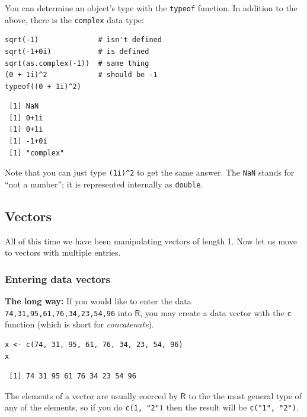 \documentclass[captions=tableheading]{scrbook}
\begin{document}
You can determine an object's type with the \texttt{typeof} function. In addition to the above, there is the \texttt{complex} data type:


\lstset{language=R}
\begin{lstlisting}
sqrt(-1)              # isn't defined
sqrt(-1+0i)           # is defined
sqrt(as.complex(-1))  # same thing
(0 + 1i)^2            # should be -1
typeof((0 + 1i)^2)
\end{lstlisting}

\begin{verbatim}
 [1] NaN
 [1] 0+1i
 [1] 0+1i
 [1] -1+0i
 [1] "complex"
\end{verbatim}

Note that you can just type \texttt{(1i)\textasciicircum{}2} to get the same answer. The \texttt{NaN} stands for ``not a number''; it is represented internally as \texttt{double}. 
\subsection{Vectors}
\label{sec-2-3-3}
\label{sub-Vectors}


All of this time we have been manipulating vectors of length 1. Now let us move to vectors with multiple entries.
\subsubsection{Entering data vectors}
\label{sec-2-3-3-1}


\textbf{The long way:} If you would like to enter the data \texttt{74,31,95,61,76,34,23,54,96} into \(\mathsf{R}\), you may create a data vector with the \texttt{c} function (which is short for \emph{concatenate}).


\lstset{language=R}
\begin{lstlisting}
x <- c(74, 31, 95, 61, 76, 34, 23, 54, 96)
x
\end{lstlisting}

\begin{verbatim}
 [1] 74 31 95 61 76 34 23 54 96
\end{verbatim}

The elements of a vector are usually coerced by \(\mathsf{R}\) to the the most general type of any of the elements, so if you do \texttt{c(1, "2")} then the result will be \texttt{c("1", "2")}.
\end{document}
